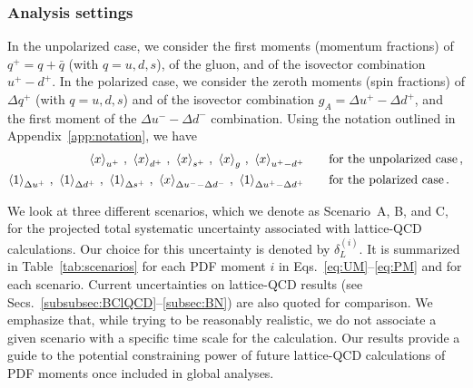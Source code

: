 \subsubsection{Analysis settings}
\label{sec:projections:settings}

In the unpolarized case,  we consider
the first moments (momentum fractions) of $q^+=q+\bar{q}$ (with $q=u,d,s$),
of the gluon, and of the isovector combination $u^+-d^+$.
%
In the polarized case, we consider the zeroth moments (spin fractions) 
of $\Delta q^+$ (with $q=u,d,s$) and of the isovector combination 
$g_A=\Delta u^+-\Delta d^+$, and the first moment of the 
$\Delta u^- - \Delta d^-$ combination.
%
Using the notation outlined in Appendix~\ref{app:notation}, we have
\begin{align}
\left\langle x\right\rangle_{u^+}\, , \
\left\langle x\right\rangle_{d^+}\, , \
\left\langle x\right\rangle_{s^+}\, , \
\left\langle x\right\rangle_{g}\, ,  \
\left\langle x\right\rangle_{u^+-d^+} & \qquad\text{for the unpolarized case} \, ,
\label{eq:UM}\\
\left\langle 1\right\rangle_{\Delta u^+}\, , \
\left\langle 1\right\rangle_{\Delta d^+}\, , \
\left\langle 1\right\rangle_{\Delta s^+}\, , \
\left\langle x\right\rangle_{\Delta u^--\Delta d^-}\, ,\
\left\langle 1\right\rangle_{\Delta u^+ - \Delta d^+} & \qquad\text{for the polarized case}\, .
\label{eq:PM}
\end{align}

We look at three different scenarios, which we denote
as Scenario~A, B, and C, for the projected total systematic
uncertainty associated with lattice-QCD calculations.
%
Our choice for this uncertainty is denoted by $\delta_L^{(i)}$.
%
It is summarized in Table~\ref{tab:scenarios} for each PDF moment $i$ in 
Eqs.~\eqref{eq:UM}--\eqref{eq:PM} and for each scenario.
%
Current uncertainties on lattice-QCD results 
(see Secs.~\ref{subsubsec:BClQCD}--\ref{subsec:BN})
are also quoted for comparison.
%
We emphasize that, while trying to be reasonably
realistic, we do not associate a given scenario
with a specific time scale for the calculation.
%
Our results provide a guide to the potential
constraining power of future lattice-QCD calculations
of PDF moments once included in global analyses. 
 
